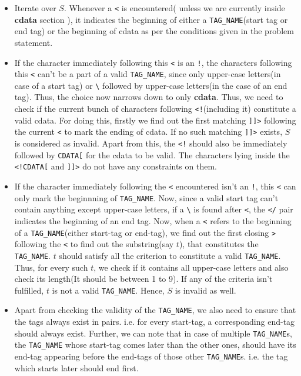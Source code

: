 \begin{itemize}
\item Iterate over $S$. Whenever a \texttt{<} is encountered( unless we are currently inside \textbf{cdata} section ), it indicates the beginning of either a \texttt{TAG\_NAME}(start tag or end tag) or the beginning of cdata as per the conditions given in the problem statement.

\item If the character immediately following this \texttt{<} is an \texttt{!}, the characters following this \texttt{\textless} can't be a part of a valid \texttt{TAG\_NAME}, since only upper-case letters(in case of a start tag) or \texttt{\textbackslash} followed by upper-case letters(in the case of an end tag). Thus, the choice now narrows down to only \textbf{cdata}. Thus, we need to check if the current bunch of characters following \texttt{\textless!}(including it) constitute a valid cdata. For doing this, firstly we find out the first matching \texttt{]]\textgreater} following the current \texttt{\textless\textexclamdown} to mark the ending of cdata. If no such matching \texttt{]]\textgreater} exists, $S$ is considered as invalid. Apart from this, the \texttt{\textless!} should also be immediately followed by \texttt{CDATA[} for the cdata to be valid. The characters lying inside the \texttt{\textless!CDATA[} and \texttt{]]\textgreater} do not have any constraints on them.

\item If the character immediately following the \texttt{<} encountered isn't an \texttt{!}, this \texttt{<} can only mark the beginnning of \texttt{TAG\_NAME}. Now, since a valid start tag can't contain anything except upper-case letters, if a \texttt{\textbackslash} is found after \texttt{<}, the \texttt{</} pair indicates the beginning of an end tag. Now, when a \texttt{<} refers to the beginning of a \texttt{TAG\_NAME}(either start-tag or end-tag), we find out the first closing \texttt{>} following the \texttt{<} to find out the substring(say $t$), that constitutes the \texttt{TAG\_NAME}. $t$ should satisfy all the criterion to constitute a valid \texttt{TAG\_NAME}. Thus, for every such $t$, we check if it contains all upper-case letters and also check its length(It should be between 1 to 9). If any of the criteria isn't fulfilled, $t$ is not a valid \texttt{TAG\_NAME}. Hence, $S$ is invalid as well.
\
\item Apart from checking the validity of the \texttt{TAG\_NAME}, we also need to ensure that the tags always exist in pairs. i.e. for every start-tag, a corresponding end-tag should always exist. Further, we can note that in case of multiple \texttt{TAG\_NAME}s, the \texttt{TAG\_NAME} whose start-tag comes later than the other ones, should have its end-tag appearing before the end-tags of those other \texttt{TAG\_NAME}s. i.e. the tag which starts later should end first.


\end{itemize}
